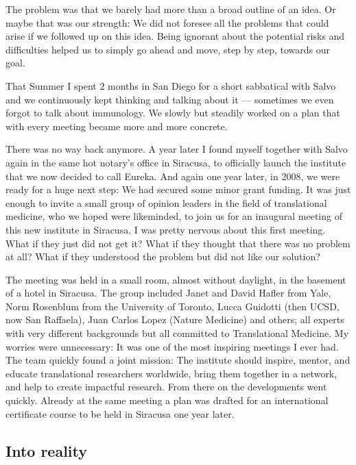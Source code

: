 \documentclass[authordate, editorial, issue]{jote-new-article}
\begin{document}
	The problem was that we barely had more than a broad outline of an idea. Or maybe that was our strength: We did not foresee all the problems that could arise if we followed up on this idea. Being ignorant about the potential risks and difficulties helped us to simply go ahead and move, step by step, towards our goal.



	That Summer I spent 2 months in San Diego for a short sabbatical with Salvo and we continuously kept thinking and talking about it — sometimes we even forgot to talk about immunology. We slowly but steadily worked on a plan that with every meeting became more and more concrete.



	There was no way back anymore. A year later I found myself together with Salvo again in the same hot notary's office in Siracusa, to officially launch the institute that we now decided to call Eureka. And again one year later, in 2008, we were ready for a huge next step: We had secured some minor grant funding. It was just enough to invite a small group of opinion leaders in the field of translational medicine, who we hoped were likeminded, to join us for an inaugural meeting of this new institute in Siracusa. I was pretty nervous about this first meeting. What if they just did not get it? What if they thought that there was no problem at all? What if they understood the problem but did not like our solution?



	The meeting was held in a small room, almost without daylight, in the basement of a hotel in Siracusa. The group included Janet and David Hafler from Yale, Norm Rosenblum from the University of Toronto, Lucca Guidotti (then UCSD, now San Raffaela), Juan Carlos Lopez (Nature Medicine) and others; all experts with very different backgrounds but all committed to Translational Medicine. My worries were unnecessary: It was one of the most inspiring meetings I ever had. The team quickly found a joint mission: The institute should inspire, mentor, and educate translational researchers worldwide, bring them together in a network, and help to create impactful research. From there on the developments went quickly. Already at the same meeting a plan was drafted for an international certificate course to be held in Siracusa one year later.







	\subsection{Into reality }
\end{document}
